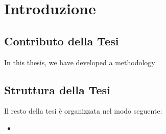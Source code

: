 


\chapter{Introduzione}\label{cap1:Introduzione}




\section{Contributo della Tesi}\label{cap1:Contributo della Tesi}
In this thesis, we have developed a methodology 


\section{Struttura della Tesi}\label{cap1:Struttura della Tesi}
Il resto della tesi è organizzata nel modo seguente:
\begin{itemize}
	\item {}
\end{itemize}
 